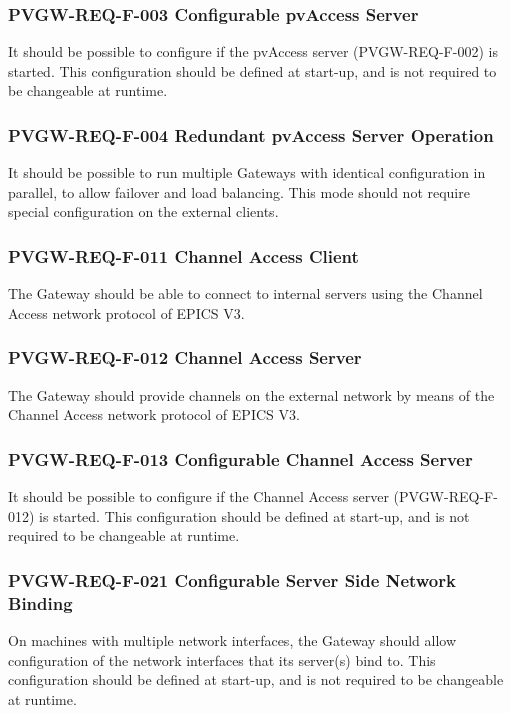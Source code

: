 \documentclass[11pt
  , a4paper
  , article
  , oneside
]{memoir}
\begin{document}
\subsubsection{PVGW-REQ-F-003 Configurable pvAccess Server}
It should be possible to configure if the pvAccess server (PVGW-REQ-F-002) is started. This configuration should be defined at start-up, and is not required to be changeable at runtime.

\subsubsection{PVGW-REQ-F-004 Redundant pvAccess Server Operation}
It should be possible to run multiple Gateways with identical configuration in parallel, to allow failover and load balancing. This mode should not require special configuration on the external clients.

\subsubsection{PVGW-REQ-F-011 Channel Access Client}
The Gateway should be able to connect to internal servers using the Channel Access network protocol of EPICS V3.

\subsubsection{PVGW-REQ-F-012 Channel Access Server}
The Gateway should provide channels on the external network by means of the Channel Access network protocol of EPICS V3.

\subsubsection{PVGW-REQ-F-013 Configurable Channel Access Server}
It should be possible to configure if the Channel Access server (PVGW-REQ-F-012) is started. This configuration should be defined at start-up, and is not required to be changeable at runtime.

\subsubsection{PVGW-REQ-F-021 Configurable Server Side Network Binding}
On machines with multiple network interfaces, the Gateway should allow configuration of the network interfaces that its server(s) bind to. This configuration should be defined at start-up, and is not required to be changeable at runtime.
\end{document}
